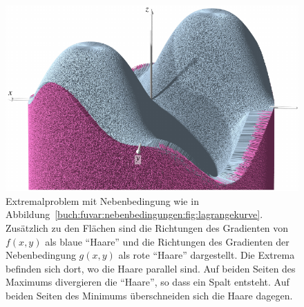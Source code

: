 %
%
%
\begin{figure}
\centering
\includegraphics{chapters/010-fuvar/images/lagrangezyl.pdf}
\caption{Extremalproblem mit Nebenbedingung wie in
Abbildung~\ref{buch:fuvar:nebenbedingungen:fig:lagrangekurve}.
Zusätzlich zu den Flächen sind die Richtungen des Gradienten  von
$f(x,y)$ als blaue ``Haare'' und die Richtungen des Gradienten der
Nebenbedingung $g(x,y)$ als rote ``Haare'' dargestellt.
Die Extrema befinden sich dort, wo die Haare parallel sind.
Auf beiden Seiten des Maximums divergieren die ``Haare'', so dass
ein Spalt entsteht.
Auf beiden Seiten des Minimums überschneiden sich die Haare dagegen.
\label{buch:fuvar:nebenbedingungen:fig:lagrangezyl}}
\end{figure}
